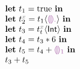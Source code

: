 

\newcommand{\THole}{\ensuremath{\SyEHole{\cdot}}}
\newcommand{\TInt}{\ensuremath{\SyTInt}}

\newcommand{\ELet}[2]{\ensuremath{\SyLet #1 = #2}}
\newcommand{\ELetAnn}[3]{\ensuremath{\SyLet #1 \SyColon #2 = #3}}
\newcommand{\EInn}{\ensuremath{\SyInn}}
\newcommand{\EIn}[1]{\ensuremath{\SyIn #1}}
\newcommand{\EPlus}[2]{\ensuremath{#1 \SyPlus #2}}
\newcommand{\ETimes}[2]{\ensuremath{#1 \SyTimes #2}}
\newcommand{\ECast}[2]{\ensuremath{#1 \SyCastL #2 \SyCastR}}

\newcommand{\ETrue}{\ensuremath{\SyTrue}}
\newcommand{\EEHole}[1]{\ensuremath{\SyEHole{#1}}}

\newcommand{\ENamed}[2]{\ensuremath{t_{#1}^{{\color{gray}#2}}}}


  \[\begin{array}{l}
    \ELet{t_1}{\ETrue} \EInn \\
    \ELet{\ENamed{2}{x}}{\ECast{t_1}{\THole}} \EInn \\
    \ELet{t_3}{\ECast{\ENamed{t}{x}}{\TInt}} \EInn \\
    \ELet{t_4}{\ETimes{t_3}{6}} \EInn \\
    \ELet{t_5}{\EPlus{t_4}{\EEHole{1}}} \EInn \\
    \EPlus{t_3}{t_5}
  \end{array}\]

